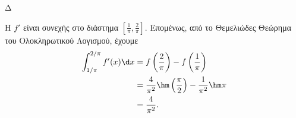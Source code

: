 \begin{thema}{Δ}
\begin{erwthma}
\item Η $f'$ είναι συνεχής στο διάστημα $\left[\frac{1}{\pi},\frac{2}{\pi}\right]$. Επομένως, από το Θεμελιώδες Θεώρημα του Ολοκληρωτικού Λογισμού, έχουμε
\begin{align*}
\int_{1/\pi}^{2/\pi}f'(x)\d x
&=f\left(\frac{2}{\pi}\right)
-f\left(\frac{1}{\pi}\right)\\
&=\frac{4}{\pi^2}
\hm\left(\frac{\pi}{2}\right)
-\frac{1}{\pi^2}\hm\pi\\
&={\frac{4}{\pi^2}}.
\end{align*}
\end{erwthma}
\end{thema}
